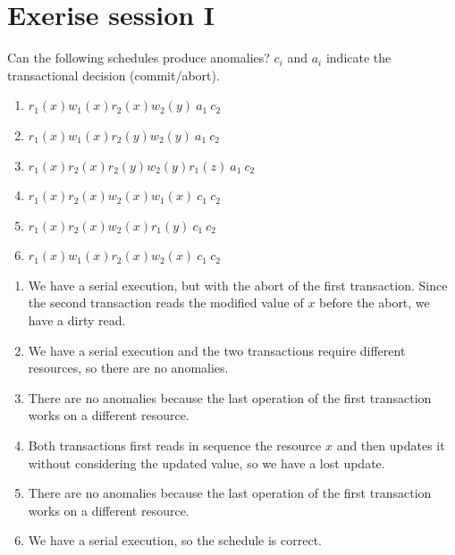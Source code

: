 \documentclass[12pt, a4paper]{report}
\newtheorem[style=M,bodystyle=\normalfont]{theorem}{Theorem}
\newtheorem[style=M,bodystyle=\normalfont]{corollary}{Corollary}
\newtheorem[style=M,bodystyle=\normalfont]{lemma}{Lemma}
\newtheorem[style=M,bodystyle=\normalfont]{definition}{Definition}
\begin{document}
\chapter{Exerise session I}
    \begin{Exercise}[label=1]
        Can the following schedules produce anomalies? $c_i$ and $a_i$ indicate the transactional decision (commit/abort). 
        \begin{enumerate}
            \item $r_1(x) w_1(x) r_2(x) w_2(y)\:a_1\:c_2$
            \item $r_1(x) w_1(x) r_2(y) w_2(y)\:a_1\:c_2$
            \item $r_1(x) r_2(x) r_2(y) w_2(y) r_1(z)\:a_1\:c_2$
            \item $r_1(x) r_2(x) w_2(x) w_1(x)\:c_1\:c_2$
            \item $r_1(x) r_2(x) w_2(x) r_1(y)\:c_1\:c_2$
            \item $r_1(x) w_1(x) r_2(x) w_2(x)\:c_1\:c_2$
        \end{enumerate}
    \end{Exercise}
    \begin{Answer}[ref=1]
        \begin{enumerate}
            \item We have a serial execution, but with the abort of the first transaction. Since the second transaction reads the modified value of $x$ before the abort, we have a
                dirty read. 
            \item We have a serial execution and the two transactions require different resources, so there are no anomalies.
            \item There are no anomalies because the last operation of the first transaction works on a different resource. 
            \item Both transactions first reads in sequence the resource $x$ and then updates it without considering the updated value, so we have a lost update. 
            \item There are no anomalies because the last operation of the first transaction works on a different resource. 
            \item We have a serial execution, so the schedule is correct. 
        \end{enumerate}
    \end{Answer}

    \newpage
    
\end{document}
